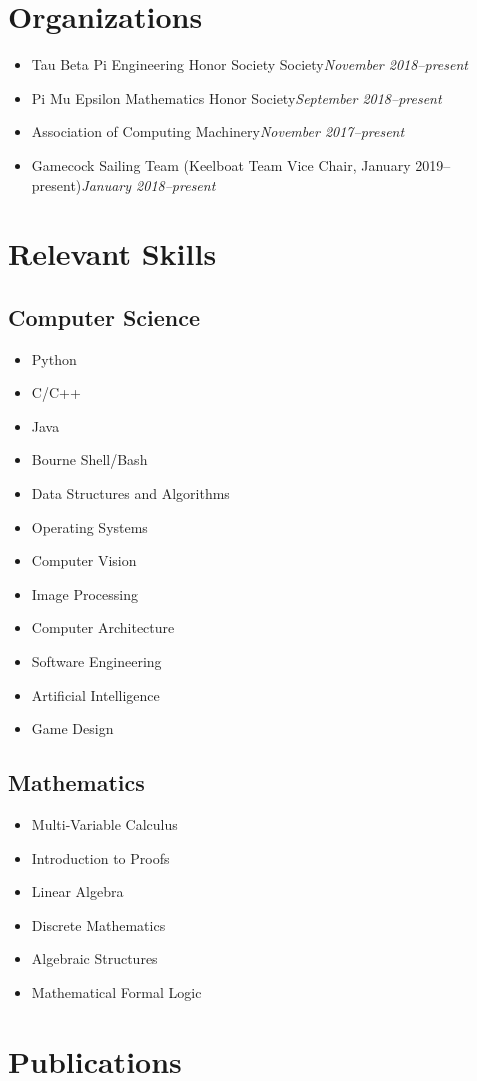 \documentclass[10pt,letterpaper,roman]{moderncv}
\renewcommand{\cvitem}[2]{\item {#1}\hfill\textit{#2}}
\begin{document}
\section{\textbf{Organizations}}
\begin{itemize}
	\cvitem{Tau Beta Pi Engineering Honor Society Society}{November 2018--present}
	\cvitem{Pi Mu Epsilon Mathematics Honor Society}{September 2018--present}
	\cvitem{Association of Computing Machinery}{November 2017--present}
	\cvitem{Gamecock Sailing Team (Keelboat Team Vice Chair, January 2019--present)}{January 2018--present}
\end{itemize}

\section{Relevant Skills}
\subsection{Computer Science}
\vspace{-1.2\topsep}
\begin{multicols}{3}
\begin{itemize}
	\item Python
	\item C/C++
	\item Java
	\item Bourne Shell/Bash
	\item Data Structures and Algorithms
	\item Operating Systems
	\item Computer Vision
	\item Image Processing
	\item Computer Architecture
	\item Software Engineering
	\item Artificial Intelligence
	\item Game Design
\end{itemize}
\end{multicols}
\subsection{Mathematics}
\vspace{-1.2\topsep}
\begin{multicols}{3}
\begin{itemize}
	\item Multi-Variable Calculus
	\item Introduction to Proofs
	\item Linear Algebra
	\item Discrete Mathematics
	\item Algebraic Structures
	\item Mathematical Formal Logic
\end{itemize}
\end{multicols}

\section{Publications}
	\nocite{*}
	\printbibliography[heading=none]{}
\end{document}
